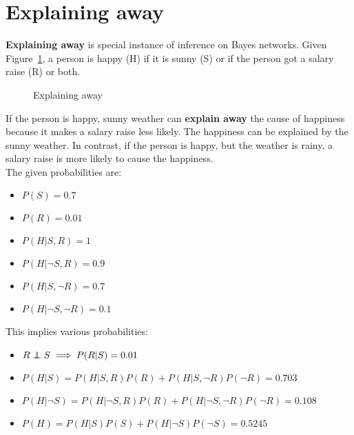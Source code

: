 \documentclass{report}
\newcommand\independent{\protect\mathpalette{\protect\independenT}{\perp}}
\def\independenT#1#2{\mathrel{\rlap{$#1#2$}\mkern2mu{#1#2}}}
\begin{document}
\section{Explaining away}
\label{chapter:explainingaway}
{\bf Explaining away} is special instance of inference on Bayes networks. Given Figure~\ref{figure:explainingaway}, a person is happy (H) if it is sunny (S) or if the person got a salary raise (R) or both.

\begin{figure}[h!]
\centering
{}
\caption{Explaining away}
\label{figure:explainingaway}
\end{figure}

If the person is happy, sunny weather can {\bf explain away} the cause of happiness because it makes a salary raise less likely.
The happiness can be explained by the sunny weather.
In contrast, if the person is happy, but the weather is rainy, a salary raise is more likely to cause the happiness.
\\
The given probabilities are:
\begin{itemize}
\item $P(S) = 0.7$
\item $P(R) = 0.01$
\item $P(H\vert S, R) = 1$
\item $P(H\vert \neg S, R) = 0.9$
\item $P(H\vert S, \neg R) = 0.7$
\item $P(H\vert \neg S, \neg R) = 0.1$
\end{itemize}

This implies various probabilities:
\begin{itemize}
\item $R\independent S \implies P(R\vert S) = 0.01$
\item $P(H\vert S) = P(H\vert S, R)P(R) + P(H\vert S, \neg R)P(\neg R) = 0.703$
\item $P(H\vert \neg S) = P(H\vert \neg S, R)P(R) + P(H\vert \neg S, \neg R)P(\neg R) = 0.108$
\item $P(H) = P(H\vert S)P(S) + P(H\vert \neg S)P(\neg S) = 0.5245$
\end{itemize}
\end{document}
